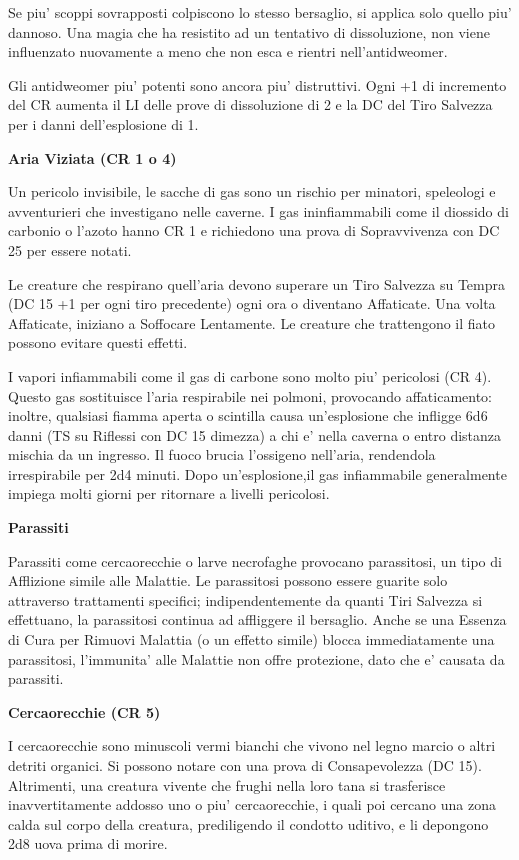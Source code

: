 \documentclass[a4paper,11pt,twoside,openany]{dndbook}
\begin{document}
{Se piu' scoppi sovrapposti colpiscono lo stesso bersaglio, si applica solo quello piu' dannoso. Una magia che ha resistito ad un tentativo di dissoluzione, non viene influenzato nuovamente a meno che non esca e rientri nell'antidweomer.

Gli antidweomer piu' potenti sono ancora piu' distruttivi. Ogni +1 di incremento del CR aumenta il LI delle prove di dissoluzione di 2 e la DC del Tiro Salvezza per i danni dell'esplosione di 1.

\textbf{Aria Viziata (CR 1 o 4)}

Un pericolo invisibile, le sacche di gas sono un rischio per minatori, speleologi e avventurieri che investigano nelle caverne. I gas ininfiammabili come il diossido di carbonio o l'azoto hanno CR 1 e richiedono una prova di Sopravvivenza con DC 25 per essere notati. 

Le creature che respirano quell'aria devono superare un Tiro Salvezza su Tempra (DC 15 +1 per ogni tiro precedente) ogni ora o diventano Affaticate. Una volta Affaticate, iniziano a Soffocare Lentamente. Le creature che trattengono il fiato possono evitare questi effetti.

I vapori infiammabili come il gas di carbone sono molto piu' pericolosi (CR 4). Questo gas sostituisce l'aria respirabile nei polmoni, provocando affaticamento: inoltre, qualsiasi fiamma aperta o scintilla causa un'esplosione che infligge 6d6 danni (TS su Riflessi con DC 15 dimezza) a chi e' nella caverna o entro distanza mischia da un ingresso. Il fuoco brucia l'ossigeno nell'aria, rendendola irrespirabile per 2d4 minuti. Dopo un'esplosione,il gas infiammabile generalmente impiega molti giorni per ritornare a livelli pericolosi.

\textbf{Parassiti}

Parassiti come cercaorecchie o larve necrofaghe provocano parassitosi, un tipo di Afflizione simile alle Malattie. Le parassitosi possono essere guarite solo attraverso trattamenti specifici; indipendentemente da quanti Tiri Salvezza si effettuano, la parassitosi continua ad affliggere il bersaglio. Anche se una Essenza di Cura per Rimuovi Malattia (o un effetto simile) blocca immediatamente una parassitosi, l'immunita' alle Malattie non offre protezione, dato che e' causata da parassiti.

\textbf{Cercaorecchie (CR 5)}

I cercaorecchie sono minuscoli vermi bianchi che vivono nel legno marcio o altri detriti organici. Si possono notare con una prova di Consapevolezza (DC 15). Altrimenti, una creatura vivente che frughi nella loro tana si trasferisce inavvertitamente addosso uno o piu' cercaorecchie, i quali poi cercano una zona calda sul corpo della creatura, prediligendo il condotto uditivo, e li depongono 2d8 uova prima di morire. 

}
\end{document}
